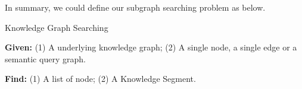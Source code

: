 
In summary, we could define our subgraph searching problem as below.


\begin{pro-stat}{Knowledge Graph Searching}
	
	\textbf{Given:} (1) A underlying knowledge graph; (2) A single node, a single edge or a semantic query graph.
	
	\textbf{Find:} (1) A list of node; (2) A Knowledge Segment.
	
\end{pro-stat}

